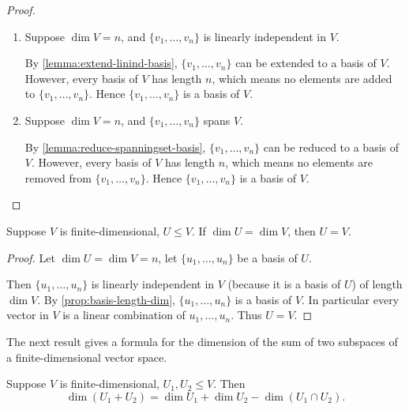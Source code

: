 \begin{proof} \
\begin{enumerate}[label=(\roman*)]
\item Suppose $\dim V=n$, and $\{v_1,\dots,v_n\}$ is linearly independent in $V$. 

By \ref{lemma:extend-linind-basis}, $\{v_1,\dots,v_n\}$ can be extended to a basis of $V$. However, every basis of $V$ has length $n$, which means no elements are added to $\{v_1,\dots,v_n\}$. Hence $\{v_1,\dots,v_n\}$ is a basis of $V$.

\item Suppose $\dim V=n$, and $\{v_1,\dots,v_n\}$ spans $V$. 

By \ref{lemma:reduce-spanningset-basis}, $\{v_1,\dots,v_n\}$ can be reduced to a basis of $V$. However, every basis of $V$ has length $n$, which means no elements are removed from $\{v_1,\dots,v_n\}$. Hence $\{v_1,\dots,v_n\}$ is a basis of $V$.
\end{enumerate}
\end{proof}

\begin{corollary}\label{cor:subspace-full-dimension-equals-whole-space}
Suppose $V$ is finite-dimensional, $U\le V$. If $\dim U=\dim V$, then $U=V$.
\end{corollary}

\begin{proof}
Let $\dim U=\dim V=n$, let $\{u_1,\dots,u_n\}$ be a basis of $U$. 

Then $\{u_1,\dots,u_n\}$ is linearly independent in $V$ (because it is a basis of $U$) of length $\dim V$. By \ref{prop:basis-length-dim}, $\{u_1,\dots,u_n\}$ is a basis of $V$. In particular every vector in $V$ is a linear combination of $u_1,\dots,u_n$. Thus $U=V$.
\end{proof}

The next result gives a formula for the dimension of the sum of two subspaces of a finite-dimensional vector space. 

\begin{lemma}
Suppose $V$ is finite-dimensional, $U_1,U_2\le V$. Then
\begin{equation}
\dim(U_1+U_2)=\dim U_1+\dim U_2-\dim(U_1\cap U_2).
\end{equation}
\end{lemma}

